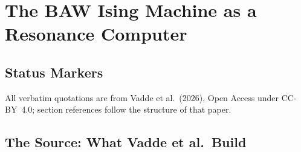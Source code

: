 
\providecommand{\BM}{\textbf{[B]}}
\providecommand{\KM}{\textbf{[K]}}
\providecommand{\SM}{\textbf{[S]}}
\providecommand{\SetzM}{\textbf{[SETZUNG]}}
\providecommand{\QM}{\textbf{[Q]}}

\chapter*{The BAW Ising Machine as a Resonance Computer}

\begin{abstract}
Vadde, Ovcharov, González, Khymyn, Litvinenko and Åkerman (Commun.\
Phys.~9:290, 8~September 2026, Open Access) present a time-multiplexed
Ising machine with 2048 spins on two quartz bulk acoustic wave delay lines.
This document reads the work as a case study of the FFGFT classification of
resonance computers (Docs.~173, 328, 343): spins as phase states of a ring
oscillator, the Barkhausen condition as winding quantisation, parametric
$\mathbb{Z}_2$ selection, a coupling regime with a chaos threshold, and ---
most clearly in quantitative terms --- a resolution floor: 99.9\,\%
approximate solutions are found reliably, exact solutions ($E=0$) are not
as problem size grows. All quotations verbatim \QM. Status of the
classifications: \SM.
\end{abstract}

\section*{Status Markers}


\noindent All verbatim quotations are from Vadde et al.\ (2026), Open Access
under CC-BY~4.0; section references follow the structure of that paper.

\section{The Source: What Vadde et al.\ Build}

